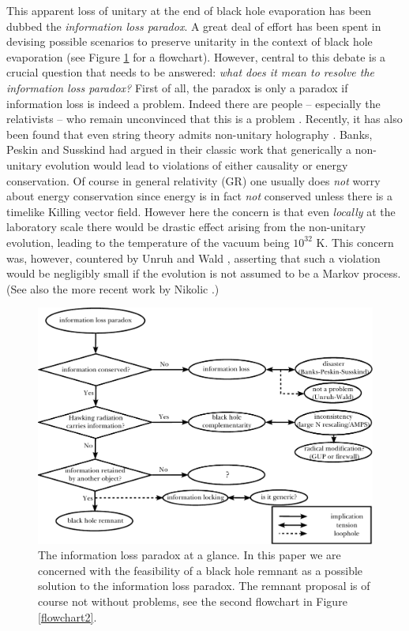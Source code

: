 \documentclass[12pt]{article}
\newcommand{\2}{$^2$}
\newcommand{\3}{$^3$}
\newcommand{\4}{$_4$}
\newcommand{\5}{$_5$}
\begin{document}
This apparent loss of unitary at the  end of black hole evaporation has been dubbed the \emph{information loss paradox}\cite{hawking1976}. A great deal of effort has been spent in devising possible scenarios to preserve unitarity in the context of black hole evaporation (see Figure \ref{flowchart1} for a flowchart). However, central to this debate is a crucial question that needs to be answered: \emph{what does it mean to resolve the information loss paradox?} First of all, the paradox is only a paradox if information loss is indeed a problem. Indeed there are people -- especially the relativists -- who remain unconvinced that this is a problem \cite{Wald1, HP}. Recently, it has also been found that even string theory admits non-unitary holography \cite{vafa}. Banks, Peskin and Susskind had argued in their classic work \cite{BPS0}  that generically a non-unitary evolution would lead to violations of  either causality or energy conservation. 
Of course in general relativity (GR) one usually does \emph{not} worry about energy conservation since energy is in fact \emph{not} conserved unless there is a timelike Killing vector field. However here the concern is that even \emph{locally} at the laboratory scale there would be drastic effect arising from the non-unitary evolution, leading to the temperature of the vacuum being $10^{32}$ K. This concern was, however, countered by Unruh and Wald \cite{WU}, asserting that such a violation would be negligibly small if the evolution is not assumed to be a Markov process. (See also the more recent work by Nikolic \cite{nikolic}.)

\begin{figure}
\begin{center}
\includegraphics[scale=0.72]{flowchart_1.pdf}
\caption{\label{flowchart1} The information loss paradox at a glance. In this paper we are concerned with the feasibility of a black hole remnant as a possible solution to the information loss paradox. The remnant proposal is of course not without problems, see the second flowchart in Figure \ref{flowchart2}.}
\end{center}
\end{figure}
\end{document}
